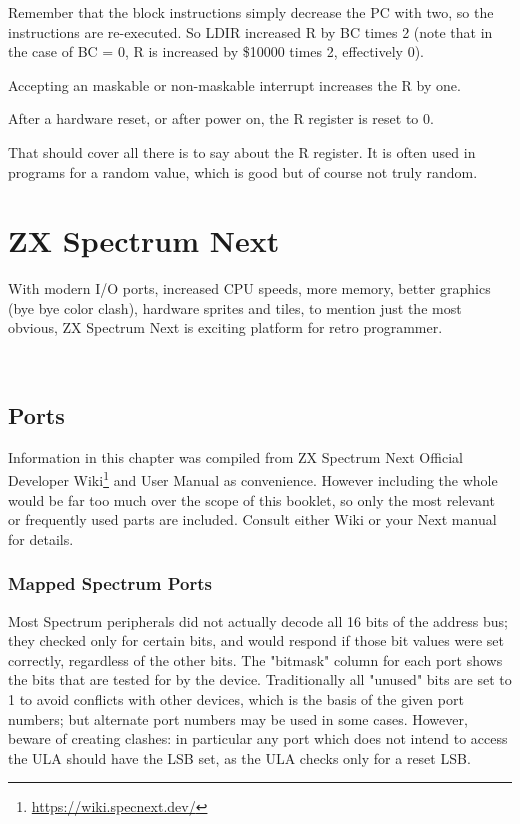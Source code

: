 \documentclass[twoside,openright,a4paper]{book}
\begin{document}
Remember that the block instructions simply decrease the PC with two, so the instructions are re-executed. So LDIR increased R by BC times 2 (note that in the case of BC = 0, R is increased by \$10000 times 2, effectively 0).

Accepting an maskable or non-maskable interrupt increases the R by one.

After a hardware reset, or after power on, the R register is reset to 0.

That should cover all there is to say about the R register. It is often used in programs for a random value, which is good but of course not truly random.




\chapter{ZX Spectrum Next}

With modern I/O ports, increased CPU speeds, more memory, better graphics (bye bye color clash), hardware sprites and tiles, to mention just the most obvious, ZX Spectrum Next is exciting platform for retro programmer.

~ %

\minitoc

\pagebreak
\section{Ports}

Information in this chapter was compiled from ZX Spectrum Next Official Developer Wiki\footnote{\url{https://wiki.specnext.dev/}} and User Manual as convenience. However including the whole would be far too much over the scope of this booklet, so only the most relevant or frequently used parts are included. Consult either Wiki or your Next manual for details.


\subsection{Mapped Spectrum Ports}

Most Spectrum peripherals did not actually decode all 16 bits of the address bus; they checked only for certain bits, and would respond if those bit values were set correctly, regardless of the other bits. The "bitmask" column for each port shows the bits that are tested for by the device. Traditionally all "unused" bits are set to 1 to avoid conflicts with other devices, which is the basis of the given port numbers; but alternate port numbers may be used in some cases. However, beware of creating clashes: in particular any port which does not intend to access the ULA should have the LSB set, as the ULA checks only for a reset LSB.
\end{document}
